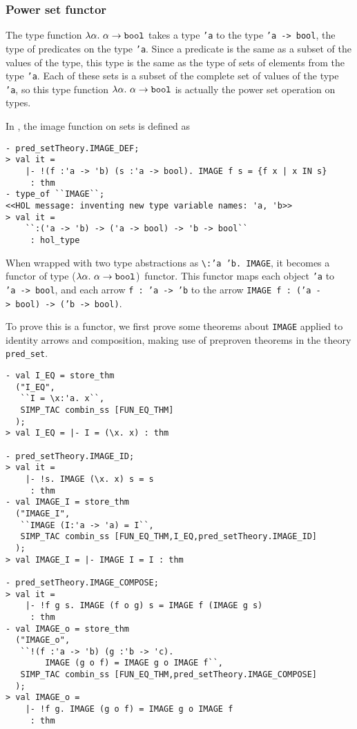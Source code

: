 \subsubsection{Power set functor}

The \HOLW{} type function 
$\lambda\alpha.~\alpha \rightarrow \mbox{\tt bool}$
takes a type {\tt 'a} to the type {\tt 'a -> bool},
the type of predicates on the type {\tt 'a}.
Since a predicate is the same as a subset of the values of the type,
this type is the same as the type of sets of elements from the type {\tt 'a}.
Each of these sets is a subset of the complete set
of values of the type {\tt 'a}, so this type function 
$\lambda\alpha.~\alpha \rightarrow \mbox{\tt bool}$
is actually the power set operation on types.

In \HOL{}, the image function on sets is defined as
\begin{session}
\begin{verbatim}
- pred_setTheory.IMAGE_DEF;
> val it =
    |- !(f :'a -> 'b) (s :'a -> bool). IMAGE f s = {f x | x IN s}
     : thm
- type_of ``IMAGE``;
<<HOL message: inventing new type variable names: 'a, 'b>>
> val it =
    ``:('a -> 'b) -> ('a -> bool) -> 'b -> bool``
     : hol_type
\end{verbatim}
\end{session}

\noindent
When wrapped with two type abstractions as
\verb|\|{\tt {:}'a~'b.~IMAGE},
it becomes a functor of type {\sf ($\lambda\alpha.~\alpha \rightarrow \mbox{\tt bool}$)~functor}.
This functor maps each object {\tt 'a} to {\tt 'a~->~bool}, and
each arrow {\tt f~:~'a~->~'b} to the arrow {\tt IMAGE~f~:~('a~->~bool)~->~('b~->~bool)}.

To prove this is a functor, we first prove some theorems about {\tt IMAGE}
applied to identity arrows and composition,
making use of preproven theorems in the theory {\tt pred\_set}.
%
\begin{session}
\begin{verbatim}
- val I_EQ = store_thm
  ("I_EQ",
   ``I = \x:'a. x``,
   SIMP_TAC combin_ss [FUN_EQ_THM]
  );
> val I_EQ = |- I = (\x. x) : thm

- pred_setTheory.IMAGE_ID;
> val it =
    |- !s. IMAGE (\x. x) s = s
     : thm
- val IMAGE_I = store_thm
  ("IMAGE_I",
   ``IMAGE (I:'a -> 'a) = I``,
   SIMP_TAC combin_ss [FUN_EQ_THM,I_EQ,pred_setTheory.IMAGE_ID]
  );
> val IMAGE_I = |- IMAGE I = I : thm

- pred_setTheory.IMAGE_COMPOSE;
> val it =
    |- !f g s. IMAGE (f o g) s = IMAGE f (IMAGE g s)
     : thm
- val IMAGE_o = store_thm
  ("IMAGE_o",
   ``!(f :'a -> 'b) (g :'b -> 'c).
        IMAGE (g o f) = IMAGE g o IMAGE f``,
   SIMP_TAC combin_ss [FUN_EQ_THM,pred_setTheory.IMAGE_COMPOSE]
  );
> val IMAGE_o =
    |- !f g. IMAGE (g o f) = IMAGE g o IMAGE f
     : thm
\end{verbatim}
\end{session}

